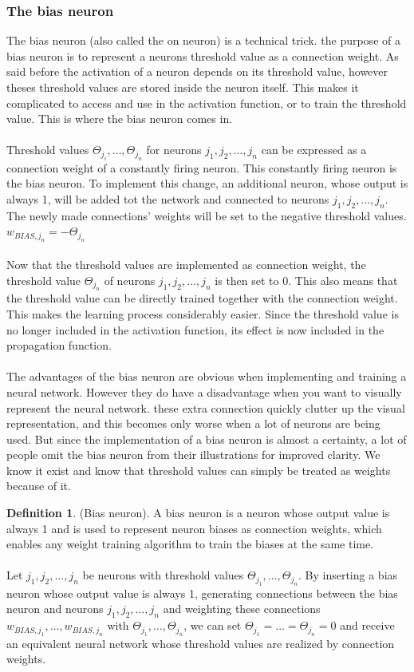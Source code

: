 \documentclass[pdftex,a4paper,12pt,twoside]{report}
\theoremstyle{plain} \newtheorem{theorem}{Theorem} \newtheorem{proposition}{Proposition} \newtheorem{lemma}{Lemma} \newtheorem*{corollary}{Corollary}
\theoremstyle{definition} \newtheorem{definition}{Definition} \newtheorem{conjecture}{Conjecture} \newtheorem*{example}{Example} \newtheorem{algorithm}{Algorithm}
\theoremstyle{remark} \newtheorem*{remark}{Remark} \newtheorem*{note}{Note} \newtheorem{case}{Case}
\begin{document}
\subsubsection{The bias neuron}
\label{subsubsec:biasneuron}
The bias neuron (also called the on neuron) is a technical trick. the purpose of a bias neuron is to represent a neurons threshold value as a connection weight. As said before the activation of a neuron depends on its threshold value, however theses threshold values are stored inside the neuron itself. This makes it complicated to access and use in the activation function, or to train the threshold value. This is where the bias neuron comes in.\\\\Threshold values $\Theta_{j_{i}}, \dotsc ,\Theta_{j_{n}}$ for neurons $j_1,j_2, \dotsc ,j_n$ can be expressed as a connection weight of a constantly firing neuron. This constantly firing neuron is the bias neuron. To implement this change, an additional neuron, whose output is always 1, will be added tot the network and connected to neurons $j_1,j_2, \dotsc ,j_n$. The newly made connections' weights will be set to the negative threshold values. $w_{BIAS,j_{n}} = - \Theta_{j_{n}}$\\\\Now that the threshold values are implemented as connection weight, the threshold value $\Theta_{j_{n}}$ of neurons $j_1,j_2, \dotsc ,j_n$ is then set to 0. This also means that the threshold value can be directly trained together with the connection weight. This makes the learning process considerably easier. Since the threshold value is no longer included in the activation function, its effect is now included in the propagation function.\\\\The advantages of the bias neuron are obvious when implementing and training a neural network. However they do have a disadvantage when you want to visually represent the neural network. these extra connection quickly clutter up the visual representation, and this becomes only worse when a lot of neurons are being used. But since the implementation of a bias neuron is almost a certainty, a lot of people omit the bias neuron from their illustrations for improved clarity. We know it exist and know that threshold values can simply be treated as weights because of it.
\begin{definition}
(Bias neuron). A bias neuron is a neuron whose output value is always 1 and is used to represent neuron biases as connection weights, which enables any weight training algorithm to train the biases at the same time.\\\\Let $j_1,j_2, \dotsc ,j_n$ be neurons with threshold values $\Theta_{j_{1}}, \dotsc ,\Theta_{j_{n}}$. By inserting a bias neuron whose output value is always 1, generating connections between the bias neuron and neurons $j_1,j_2, \dotsc ,j_n$ and weighting these connections $w_{BIAS,j_{1}},\dotsc,w_{BIAS,j_{n}}$ with $\Theta_{j_{1}}, \dotsc ,\Theta_{j_{n}}$, we can set $\Theta_{j_{1}}= \ldots = \Theta_{j_{n}} = 0$ and receive an equivalent neural network whose threshold values are realized by connection weights.
\end{definition}
\end{document}
